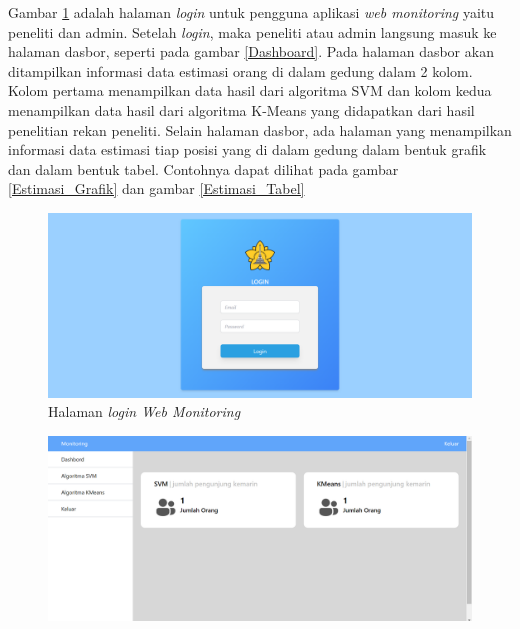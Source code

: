 \begin{enumerate}[a.]
	      \par Gambar \ref{LoginWeb} adalah halaman \textit{login} untuk pengguna aplikasi \textit{web monitoring} yaitu peneliti dan admin. Setelah \textit{login}, maka peneliti atau admin langsung masuk ke halaman dasbor, seperti pada gambar \ref{Dashboard}. Pada halaman dasbor akan ditampilkan informasi data estimasi orang di dalam gedung dalam 2 kolom. Kolom pertama menampilkan data hasil dari algoritma SVM dan kolom kedua menampilkan data hasil dari algoritma K-Means yang didapatkan dari hasil penelitian rekan peneliti. Selain halaman dasbor, ada halaman yang menampilkan informasi data estimasi tiap posisi yang di dalam gedung dalam bentuk grafik dan dalam bentuk tabel. Contohnya dapat dilihat pada gambar \ref{Estimasi_Grafik} dan gambar \ref{Estimasi_Tabel}


	      \vspace{-0cm}
	      \begin{figure}[H]
		      \center
		      \includegraphics [width = 13.5 cm, height= 6.75 cm]{gambar/web/Login}
		      \caption{Halaman \textit{login Web Monitoring}}
		      \label{LoginWeb}
	      \end{figure}
	      \begin{figure}[H]
		      \center
		      \includegraphics [width = 13.5 cm, height= 6.75 cm]{gambar/web/Dashbord}

\end{figure}
\end{enumerate}
